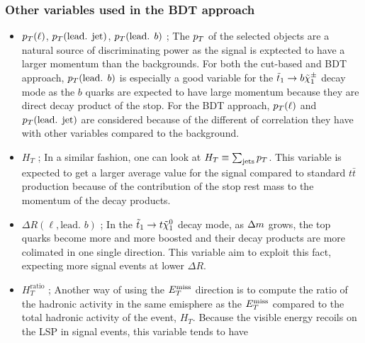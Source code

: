         
        
        \subsubsection{Other variables used in the BDT approach}

            \begin{itemize}
                \item $p_T(\ell)$, $p_T(\text{lead. jet})$, $p_T(\text{lead. } b)$ ; The $p_T$ of the 
                    selected objects are a natural source of discriminating power as the signal is exptected 
                    to have a larger momentum than the backgrounds. For both the cut-based and BDT approach, 
                    $p_T(\text{lead. } b)$ is especially a good variable for the $\tilde{t}_1 \rightarrow b \tilde{\chi}_1^\pm$ 
                    decay mode as the $b$ quarks are expected to have large momentum because they are direct 
                    decay product of the stop. For the BDT approach, $p_T(\ell)$ and $p_T(\text{lead. jet})$ 
                    are considered because of the different of correlation they have with other variables 
                    compared to the background.
                \item $H_T$ ; In a similar fashion, one can look at $H_T \equiv \sum_{\text{jets}} p_T$. 
                    This variable is expected to get a larger average value for the signal compared to standard 
                    $t\bar{t}$ production because of the contribution of the stop rest mass to the momentum of 
                    the decay products.
                \item $\Delta R( \ell, \text{lead. } b)$ ; In the $\tilde{t}_1 \rightarrow t \tilde{\chi}_1^0$ decay mode,
                    as $\Delta m$ grows, the top quarks become more and more boosted and their decay products are 
                    more colimated in one single direction. This variable aim to exploit this fact, expecting more 
                    signal events at lower $\Delta R$. 
                \item $H_{T}^\text{ratio}$ ; Another way of using the $E_T^\text{miss}$ direction is to compute the ratio of the
                    hadronic activity in the same emisphere as the $E_T^\text{miss}$ compared to the total hadronic activity of the event,
                    $H_T$. Because the visible energy recoils on the LSP in signal events, this variable tends to have

\end{itemize}
